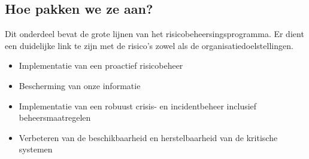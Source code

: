 \documentclass[11pt]{article}
\begin{document}
\subsection{Hoe pakken we ze aan?}
\label{sec:org83f3470}
Dit onderdeel bevat de grote lijnen van het risicobeheersingsprogramma. Er dient een duidelijke link te zijn met de risico's zowel als de organisatiedoelstellingen.
\begin{itemize}
\item Implementatie van een proactief risicobeheer
\item Bescherming van onze informatie
\item Implementatie van een robuust crisis- en incidentbeheer inclusief beheersmaatregelen
\item Verbeteren van de beschikbaarheid en herstelbaarheid van de kritische systemen
\end{itemize}
\end{document}
